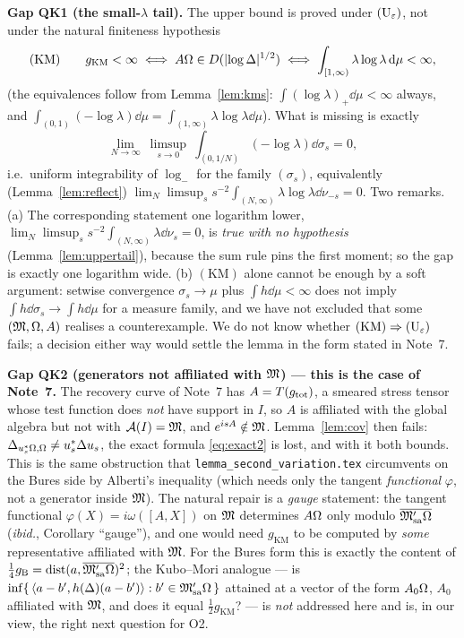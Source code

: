 \documentclass[11pt]{article}
\newcommand{\ip}[2]{\langle#1,#2\rangle}\newcommand{\norm}[1]{\lVert#1\rVert}
\newcommand{\gKM}{g_{\mathrm{KM}}}\newcommand{\gB}{g_{\mathrm B}}
\begin{document}
\begin{verdictgap}
\textbf{Gap QK1 (the small-$\lambda$ tail).}  The upper bound is proved under $(\mathrm U_\varepsilon)$, not under
the natural finiteness hypothesis
\[
 (\mathrm{KM})\qquad \gKM<\infty\iff A\Om\in D(\lvert\log\Delta\rvert^{1/2})
 \iff\int_{[1,\infty)}\lambda\log\lambda\dd\mu<\infty ,
\]
(the equivalences follow from Lemma~\ref{lem:kms}: $\int(\log\lambda)_+\dd\mu<\infty$ always, and
$\int_{(0,1)}(-\log\lambda)\dd\mu=\int_{(1,\infty)}\lambda\log\lambda\dd\mu$).  What is missing is exactly
\[
 \lim_{N\to\infty}\ \limsup_{s\to0}\ \int_{(0,1/N)}(-\log\lambda)\dd\sigma_s=0,
\]
i.e.\ uniform integrability of $\log_-$ for the family $(\sigma_s)$, equivalently (Lemma~\ref{lem:reflect})
$\lim_N\limsup_s s^{-2}\int_{(N,\infty)}\lambda\log\lambda\dd\nu_{-s}=0$.  Two remarks.  (a) The
corresponding statement one logarithm lower, $\lim_N\limsup_ss^{-2}\int_{(N,\infty)}\lambda\dd\nu_s=0$, is
\emph{true with no hypothesis} (Lemma~\ref{lem:uppertail}), because the sum rule pins the first moment; so
the gap is exactly one logarithm wide.  (b) $(\mathrm{KM})$ alone cannot be enough by a soft argument:
setwise convergence $\sigma_s\to\mu$ plus $\int h\dd\mu<\infty$ does not imply
$\int h\dd\sigma_s\to\int h\dd\mu$ for a measure family, and we have not excluded that some
$(\mathfrak M,\Omega,A)$ realises a counterexample.  We do not know whether $(\mathrm{KM})\Rightarrow(\mathrm U_\varepsilon)$
fails; a decision either way would settle the lemma in the form stated in Note~7.
\end{verdictgap}

\begin{verdictgap}
\textbf{Gap QK2 (generators not affiliated with $\mathfrak M$) --- this is the case of Note~7.}  The recovery curve
of Note~7 has $A=T(g_{\rm tot})$, a smeared stress tensor whose test function does \emph{not} have support
in $I$, so $A$ is affiliated with the global algebra but not with $\mathcal A(I)=\mathfrak M$, and $e^{isA}\notin\mathfrak M$.
Lemma~\ref{lem:cov} then fails: $\Delta_{u_s^*\Omega,\Omega}\neq u_s^*\Delta u_s$, the exact formula
\eqref{eq:exact2} is lost, and with it both bounds.  This is the same obstruction that
\texttt{lemma\_second\_variation.tex} circumvents on the Bures side by Alberti's inequality (which needs
only the tangent \emph{functional} $\varphi$, not a generator inside $\mathfrak M$).  The natural repair is a
\emph{gauge} statement: the tangent functional $\varphi(X)=i\omega([A,X])$ on $\mathfrak M$ determines
$A\Omega$ only modulo $\overline{\mathfrak M'_{\mathrm{sa}}\Omega}$ (\emph{ibid.}, Corollary ``gauge''), and one would
need $\gKM$ to be computed by \emph{some} representative affiliated with $\mathfrak M$.  For the Bures form this is
exactly the content of $\frac14\gB=\dist(a,\overline{\cM'_{\mathrm{sa}}\Om})^2$; the Kubo--Mori analogue
--- is $\inf\{\,\ip{a-b'}{h(\Delta)(a-b')}:b'\in\cM'_{\mathrm{sa}}\Om\,\}$ attained at a vector of the form
$A_0\Omega$, $A_0$ affiliated with $\mathfrak M$, and does it equal $\frac12\gKM$? --- is \emph{not} addressed here
and is, in our view, the right next question for O2.
\end{verdictgap}
\end{document}
